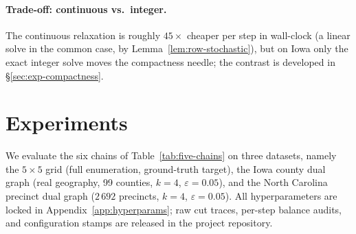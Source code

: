 \documentclass[11pt]{article}
\begin{document}
\paragraph{Trade-off: continuous vs.\ integer.}\label{sec:iqp-pareto}
The continuous relaxation is roughly $45\times$ cheaper per step in
wall-clock (a linear solve in the common case, by
Lemma~\ref{lem:row-stochastic}), but on Iowa only the exact integer
solve moves the compactness needle; the contrast is developed in
\S\ref{sec:exp-compactness}.

\section{Experiments}\label{sec:experiments}

We evaluate the six chains of Table~\ref{tab:five-chains} on three
datasets, namely the $5 \times 5$ grid (full enumeration, ground-truth
target), the Iowa county dual graph (real geography, 99 counties,
$k = 4$, $\varepsilon = 0.05$), and the North Carolina precinct dual
graph ($2\,692$ precincts, $k = 4$, $\varepsilon = 0.05$). All hyperparameters are
locked in Appendix~\ref{app:hyperparams}; raw cut traces, per-step
balance audits, and configuration stamps are released in the project
repository.
\end{document}
